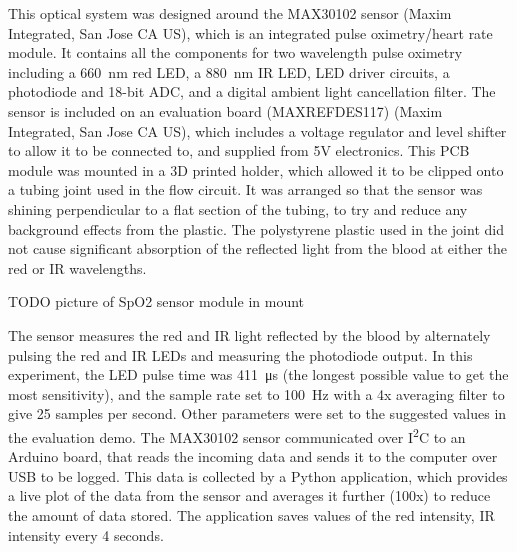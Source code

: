 This optical system was designed around the MAX30102 sensor (Maxim Integrated, San Jose CA US), which is an integrated pulse oximetry/heart rate module.
It contains all the components for two wavelength pulse oximetry including a \SI{660}{nm} red LED, a \SI{880}{nm} IR LED, LED driver circuits, a photodiode and 18-bit ADC, and a digital ambient light cancellation filter.
The sensor is included on an evaluation board (MAXREFDES117) (Maxim Integrated, San Jose CA US), which includes a voltage regulator and level shifter to allow it to be connected to, and supplied from 5V electronics.
This PCB module was mounted in a 3D printed holder, which allowed it to be clipped onto a tubing joint used in the flow circuit.
It was arranged so that the sensor was shining perpendicular to a flat section of the tubing, to try and reduce any background effects from the plastic.
The polystyrene plastic used in the joint did not cause significant absorption of the reflected light from the blood at either the red or IR wavelengths.

TODO picture of SpO2 sensor module in mount

The sensor measures the red and IR light reflected by the blood by alternately pulsing the red and IR LEDs and measuring the photodiode output.
In this experiment, the LED pulse time was \SI{411}{\micro\second} (the longest possible value to get the most sensitivity), and the sample rate set to \SI{100}{Hz} with a 4x averaging filter to give 25 samples per second.
Other parameters were set to the suggested values in the evaluation demo.
The MAX30102 sensor communicated over I\textsuperscript{2}C to an Arduino board, that reads the incoming data and sends it to the computer over USB to be logged.
This data is collected by a Python application, which provides a live plot of the data from the sensor and averages it further (100x) to reduce the amount of data stored.
The application saves values of the red intensity, IR intensity every 4 seconds.

